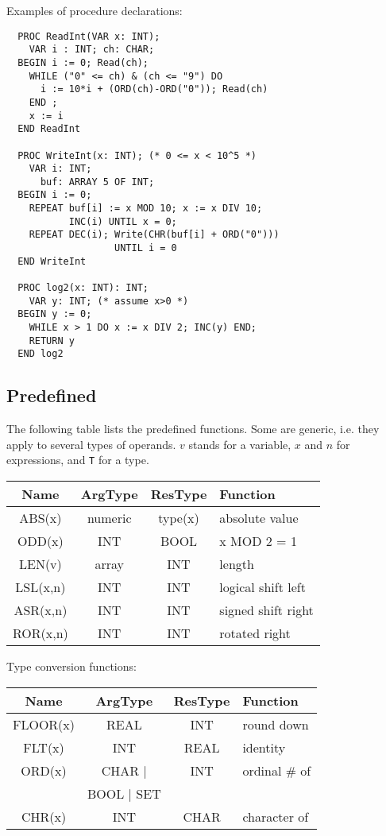 Examples of procedure declarations:
\begin{verbatim}
  PROC ReadInt(VAR x: INT);
    VAR i : INT; ch: CHAR;
  BEGIN i := 0; Read(ch);
    WHILE ("0" <= ch) & (ch <= "9") DO
      i := 10*i + (ORD(ch)-ORD("0")); Read(ch)
    END ;
    x := i
  END ReadInt
 
  PROC WriteInt(x: INT); (* 0 <= x < 10^5 *)
    VAR i: INT;
      buf: ARRAY 5 OF INT;
  BEGIN i := 0;
    REPEAT buf[i] := x MOD 10; x := x DIV 10;
           INC(i) UNTIL x = 0;
    REPEAT DEC(i); Write(CHR(buf[i] + ORD("0")))
                   UNTIL i = 0
  END WriteInt
 
  PROC log2(x: INT): INT;
    VAR y: INT; (* assume x>0 *)
  BEGIN y := 0;
    WHILE x > 1 DO x := x DIV 2; INC(y) END;
    RETURN y
  END log2
\end{verbatim}

\subsection{Predefined}
\label{sub:ppro}
The following table lists the predefined functions. Some are generic, i.e. they apply to
several types of operands. $v$ stands for a variable, $x$ and $n$ for expressions,
and \verb|T| for a type.
\begin{table}[h!]
  \centering
  \begin{tabular}{c c c l}
    Name     & ArgType & ResType & Function \\\hline
    ABS(x)   & numeric & type(x) & absolute value \\
    ODD(x)   & INT     & BOOL    & x MOD 2 = 1 \\
    LEN(v)   & array   & INT     & length \\
    LSL(x,n) & INT     & INT     & logical shift left \\
    ASR(x,n) & INT     & INT     & signed shift right \\
    ROR(x,n) & INT     & INT     & rotated right
  \end{tabular}
\end{table}

Type conversion functions:
\begin{table}[h!]
  \centering
  \begin{tabular}{c c c l}
    Name     & ArgType & ResType & Function \\\hline
    FLOOR(x) & REAL    & INT     & round down \\
    FLT(x)   & INT     & REAL    & identity \\
    ORD(x)   & CHAR |  & INT     & ordinal \# of \\
             & BOOL | SET \\
    CHR(x)   & INT     & CHAR    & character of \\
  \end{tabular}
\end{table}

